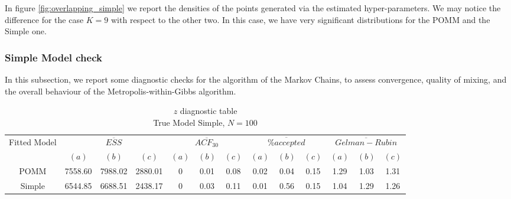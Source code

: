 \documentclass[11pt]{amsart}
\begin{document}
In figure \eqref{fig:overlapping_simple} we report the densities of the points generated via the estimated hyper-parameters. We may notice the difference for the case $K=9$ with respect to the other two. In this case, we have very significant distributions for the POMM and the Simple one.


\clearpage




\subsubsection{Simple Model check}

In this subsection, we report some diagnostic checks for the algorithm of the Markov Chains, to assess convergence, quality of mixing, and the overall behaviour of the Metropolis-within-Gibbs algorithm.




\begin{table}[h]
\centering
\caption{
{\large $z$ diagnostic table} \\ 
{\small True Model Simple, $N=100$}
} 
\begin{tabular}{ccccccccccccc}
\toprule
\multirow{2}{*}{Fitted Model} & \multicolumn{3}{c}{$\overline{ESS}$} & \multicolumn{3}{c}{
$\overline{ACF_{30}}$} & \multicolumn{3}{c}{$\overline{\% accepted}$} & \multicolumn{3}{c}{$\overline{Gelman-Rubin}$}\\
\cmidrule(lr){2-4} \cmidrule(lr){5-7} \cmidrule(lr){8-10} \cmidrule(lr){11-13} 
& $(a)$ & $(b)$ & $(c)$ & $(a)$ & $(b)$ & $(c)$ & $(a)$ & $(b)$ & $(c)$ & $(a)$ & $(b)$ & $(c)$ \\
\midrule
POMM &7558.60 & 7988.02 & 2880.01 & 0 & 0.01 & 0.08 & 0.02 & 0.04 & 0.15 &  1.29 & 1.03 & 1.31  \\
Simple &6544.85 & 6688.51 & 2438.17 & 0 & 0.03 & 0.11 & 0.01 & 0.56 & 0.15 & 1.04 & 1.29 & 1.26   \\
\bottomrule
\end{tabular}
\label{table:z_diagnostics_simple}
\end{table}
\end{document}
